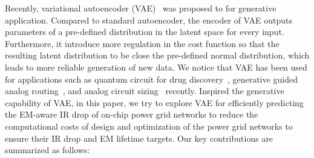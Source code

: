    
Recently, variational autoencoder (VAE)~\cite{Diederik:arxiv'22} was proposed to for generative application. Compared to standard autoencoder, the encoder of VAE outputs parameters of a pre-defined distribution in the latent space for every input. Furthermore, it introduce more regulation in the cost function so that the resulting latent distribution to be close the pre-defined normal distribution, which leads to more reliable generation of new data. We notice that VAE has been used for applications such as quantum circuit for drug discovery~\cite{Li:DATE'22}, generative guided analog routing~\cite{Zhu:ICCAD'19}, and analog circuit sizing~\cite{Touloupas:SMACD'22} recently.
Inspired the generative capability of VAE, in this paper, we try to explore VAE for efficiently predicting the EM-aware IR drop of on-chip power grid networks to reduce the computational costs of design and optimization of  the power grid networks to ensure their IR drop and EM lifetime targets.  Our key contributions are summarized as follows:

